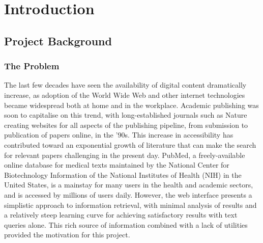 \documentclass[Report.tex]{subfiles}
\begin{document}
\chapter{Introduction}
\section{Project Background}
\subsection{The Problem}
The last few decades have seen the availability of digital content dramatically increase, as adoption of the World Wide Web and other internet technologies became widespread both at home and in the workplace. Academic publishing was soon to capitalise on this trend, with long-established journals such as Nature creating websites for all aspects of the publishing pipeline, from submission to publication of papers online, in the '90s\cite{nature-history}. This increase in accessibility has contributed toward an exponential growth of literature\cite{hunter-cohen} that can make the search for relevant papers challenging in the present day. PubMed, a freely-available online database for medical texts maintained by the National Center for Biotechnology Information of the National Institutes of Health (NIH) in the United States, is a mainstay for many users in the health and academic sectors, and is accessed by millions of users daily\cite{dogan}. However, the web interface presents a simplistic approach to information retrieval, with minimal analysis of results and a relatively steep learning curve for achieving satisfactory results with text queries alone. This rich source of information combined with a lack of utilities provided the motivation for this project.
\end{document}
